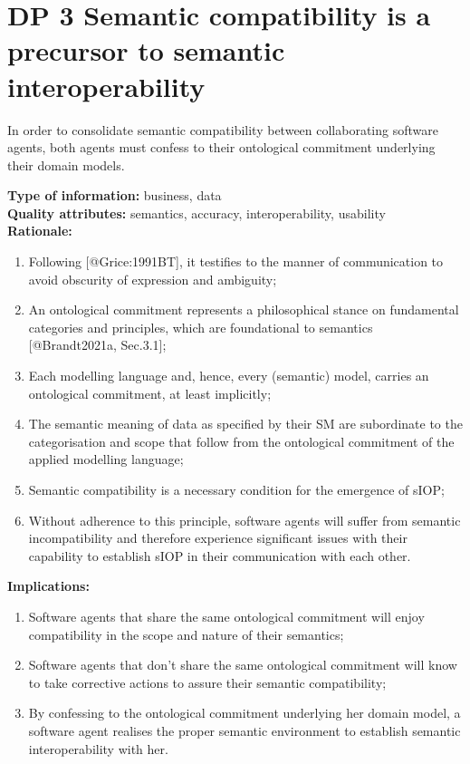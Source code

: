 \documentclass[sort&compress,preprint,authoryear,3p,twocolumn]{elsarticle}
\begin{document}
\hypertarget{dp-3-semantic-compatibility-is-a-precursor-to-semantic-interoperability}{%
\section{DP 3 Semantic compatibility is a precursor to semantic
interoperability}\label{dp-3-semantic-compatibility-is-a-precursor-to-semantic-interoperability}}

\begin{mmdp}\label{dp:scp}

In order to consolidate semantic compatibility between collaborating software agents, both agents must confess to their ontological commitment underlying their domain models.

\textbf{Type of information:} business, data  \\
\textbf{Quality attributes:} semantics, accuracy, interoperability, usability   \\
\textbf{Rationale:}
\begin{enumerate}
  \item Following [@Grice:1991BT], it testifies to the manner of communication to avoid obscurity of expression and ambiguity;
  \item An ontological commitment represents a philosophical stance on fundamental categories and principles, which are foundational to semantics [@Brandt2021a, Sec.3.1];
  \item Each modelling language and, hence, every (semantic) model, carries an ontological commitment, at least implicitly;
  \item The semantic meaning of data as specified by their SM are subordinate to the categorisation and scope that follow from the ontological commitment of the applied modelling language; 
  \item Semantic compatibility is a necessary condition for the emergence of sIOP; 
  \item Without adherence to this principle, software agents will suffer from semantic incompatibility and therefore experience significant issues with their capability to establish sIOP in their communication with each other.
\end{enumerate}
\textbf{Implications:}
\begin{enumerate}
  \item Software agents that share the same ontological commitment will enjoy compatibility in the scope and nature of their semantics;
  \item Software agents that don’t share the same ontological commitment will know to take corrective actions to assure their semantic compatibility;
  \item By confessing to the ontological commitment underlying her domain model, a software agent realises the proper semantic environment to establish semantic interoperability with her.
\end{enumerate}  
\end{mmdp}
\end{document}
